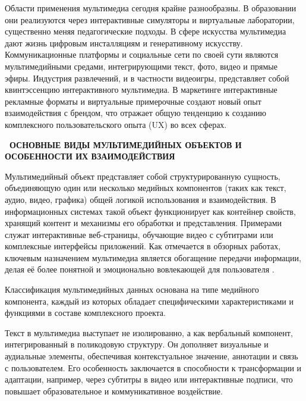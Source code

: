 \documentclass{SibFU-docs}
\begin{document}

Области применения мультимедиа сегодня крайне разнообразны. В образовании они реализуются через интерактивные симуляторы и виртуальные лаборатории, существенно меняя педагогические подходы. В сфере искусства мультимедиа дают жизнь цифровым инсталляциям и генеративному искусству. Коммуникационные платформы и социальные сети по своей сути являются мультимедийными средами, интегрирующими текст, фото, видео и прямые эфиры. Индустрия развлечений, и в частности видеоигры, представляет собой квинтэссенцию интерактивного мультимедиа. В маркетинге интерактивные рекламные форматы и виртуальные примерочные создают новый опыт взаимодействия с брендом, что отражает общую тенденцию к созданию комплексного пользовательского опыта (UX) во всех сферах.

\newpage
{}
\begin{center}\textbf{\thesection\ ОСНОВНЫЕ ВИДЫ МУЛЬТИМЕДИЙНЫХ ОБЪЕКТОВ И ОСОБЕННОСТИ ИХ ВЗАИМОДЕЙСТВИЯ}\end{center}
\vspace*{-1.5em}

Мультимедийный объект представляет собой структурированную сущность, объединяющую один или несколько медийных компонентов (таких как текст, аудио, видео, графика) общей логикой использования и взаимодействия. В информационных системах такой объект функционирует как контейнер свойств, хранящий контент и механизмы его обработки и представления. Примерами служат интерактивные веб-страницы, обучающие видео с субтитрами или комплексные интерфейсы приложений. Как отмечается в обзорных работах, ключевым назначением мультимедиа является обогащение передачи информации, делая её более понятной и эмоционально вовлекающей для пользователя \cite{web87}.


Классификация мультимедийных данных основана на типе медийного компонента, каждый из которых обладает специфическими характеристиками и функциями в составе комплексного проекта.


Текст в мультимедиа выступает не изолированно, а как вербальный компонент, интегрированный в поликодовую структуру. Он дополняет визуальные и аудиальные элементы, обеспечивая контекстуальное значение, аннотации и связь с пользователем. Его особенность заключается в способности к трансформации и адаптации, например, через субтитры в видео или интерактивные подписи, что повышает образовательное и коммуникативное воздействие.
\end{document}
